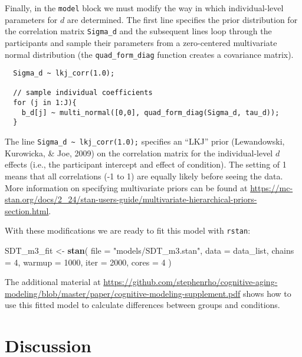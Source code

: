 \documentclass[
  english,
  ,man,floatsintext]{apa6}
\newenvironment{Shaded}{\begin{snugshade}}{\end{snugshade}}
\newcommand{\DataTypeTok}[1]{\textcolor[rgb]{0.13,0.29,0.53}{#1}}
\newcommand{\DecValTok}[1]{\textcolor[rgb]{0.00,0.00,0.81}{#1}}
\newcommand{\KeywordTok}[1]{\textcolor[rgb]{0.13,0.29,0.53}{\textbf{#1}}}
\newcommand{\NormalTok}[1]{#1}
\newcommand{\StringTok}[1]{\textcolor[rgb]{0.31,0.60,0.02}{#1}}
\begin{document}
Finally, in the \texttt{model} block we must modify the way in which individual-level parameters for \(d\) are determined. The first line specifies the prior distribution for the correlation matrix \texttt{Sigma\_d} and the subsequent lines loop through the participants and sample their parameters from a zero-centered multivariate normal distribution (the \texttt{quad\_form\_diag} function creates a covariance matrix).

\begin{verbatim}
  Sigma_d ~ lkj_corr(1.0);

  // sample individual coefficients
  for (j in 1:J){
    b_d[j] ~ multi_normal([0,0], quad_form_diag(Sigma_d, tau_d));
  }
\end{verbatim}

The line \texttt{Sigma\_d\ \textasciitilde{}\ lkj\_corr(1.0);} specifies an \enquote{LKJ} prior (Lewandowski, Kurowicka, \& Joe, 2009) on the correlation matrix for the individual-level \(d\) effects (i.e., the participant intercept and effect of condition). The setting of 1 means that all correlations (-1 to 1) are equally likely before seeing the data. More information on specifying multivariate priors can be found at \url{https://mc-stan.org/docs/2_24/stan-users-guide/multivariate-hierarchical-priors-section.html}.

With these modifications we are ready to fit this model with \texttt{rstan}:

\begin{Shaded}
\begin{Highlighting}[]
\NormalTok{SDT_m3_fit <-}\StringTok{ }\KeywordTok{stan}\NormalTok{(}
  \DataTypeTok{file =} \StringTok{"models/SDT_m3.stan"}\NormalTok{,}
  \DataTypeTok{data =}\NormalTok{ data_list,}
  \DataTypeTok{chains =} \DecValTok{4}\NormalTok{,}
  \DataTypeTok{warmup =} \DecValTok{1000}\NormalTok{,}
  \DataTypeTok{iter =} \DecValTok{2000}\NormalTok{,}
  \DataTypeTok{cores =} \DecValTok{4}
\NormalTok{)}
\end{Highlighting}
\end{Shaded}

The additional material at \url{https://github.com/stephenrho/cognitive-aging-modeling/blob/master/paper/cognitive-modeling-supplement.pdf} shows how to use this fitted model to calculate differences between groups and conditions.

\hypertarget{discussion}{%
\section{Discussion}\label{discussion}}
\end{document}

